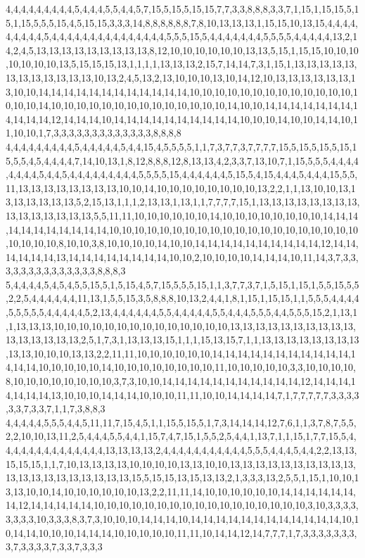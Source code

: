 4,4,4,4,4,4,4,4,4,5,4,4,4,5,5,4,4,5,7,15,5,15,5,15,15,7,7,3,3,8,8,8,3,3,7,1,15,1,15,15,5,15,1,15,5,5,5,15,4,5,15,15,3,3,3,14,8,8,8,8,8,8,7,8,10,13,13,13,1,15,15,10,13,15,4,4,4,4,4,4,4,4,4,5,4,4,4,4,4,4,4,4,4,4,4,4,4,4,4,5,5,5,15,5,4,4,4,4,4,4,4,5,5,5,5,4,4,4,4,4,13,2,14,2,4,5,13,13,13,13,13,13,13,13,13,8,12,10,10,10,10,10,10,13,13,5,15,1,15,15,10,10,10,10,10,10,10,13,5,15,15,15,13,1,1,1,1,13,13,13,2,15,7,14,14,7,3,1,15,1,13,13,13,13,13,13,13,13,13,13,13,13,10,13,2,4,5,13,2,13,10,10,10,13,10,14,12,10,13,13,13,13,13,13,13,10,10,14,14,14,14,14,14,14,14,14,14,14,14,10,10,10,10,10,10,10,10,10,10,10,10,10,10,10,10,14,10,10,10,10,10,10,10,10,10,10,10,10,10,10,14,10,10,14,14,14,14,14,14,14,14,14,14,14,12,14,14,14,10,14,14,14,14,14,14,14,14,14,14,10,10,10,14,10,10,14,14,10,11,10,10,1,7,3,3,3,3,3,3,3,3,3,3,3,3,3,8,8,8,8
4,4,4,4,4,4,4,4,4,5,4,4,4,4,4,5,4,4,15,4,5,5,5,5,1,1,7,3,7,7,3,7,7,7,7,15,5,15,5,15,5,15,15,5,5,4,5,4,4,4,4,7,14,10,13,1,8,12,8,8,8,12,8,13,13,4,2,3,3,7,13,10,7,1,15,5,5,5,4,4,4,4,4,4,4,4,5,4,4,5,4,4,4,4,4,4,4,4,4,5,5,5,5,15,4,4,4,4,4,4,5,15,5,4,15,4,4,4,5,4,4,4,15,5,5,11,13,13,13,13,13,13,13,13,10,10,14,10,10,10,10,10,10,10,10,13,2,2,1,1,13,10,10,13,13,13,13,13,13,13,5,2,15,13,1,1,1,2,13,13,1,13,1,1,7,7,7,7,15,1,13,13,13,13,13,13,13,13,13,13,13,13,13,13,13,5,5,11,11,10,10,10,10,10,10,14,10,10,10,10,10,10,10,10,14,14,14,14,14,14,14,14,14,14,14,10,10,10,10,10,10,10,10,10,10,10,10,10,10,10,10,10,10,10,10,10,10,10,10,8,10,10,3,8,10,10,10,10,14,10,10,14,14,14,14,14,14,14,14,14,14,12,14,14,14,14,14,14,13,14,14,14,14,14,14,14,14,10,10,2,10,10,10,10,14,14,14,10,11,14,3,7,3,3,3,3,3,3,3,3,3,3,3,3,3,3,8,8,8,3
5,4,4,4,4,5,4,5,4,5,5,15,5,1,5,15,4,5,7,15,5,5,5,15,1,1,3,7,7,3,7,1,5,15,1,15,1,5,5,15,5,5,2,2,5,4,4,4,4,4,4,11,13,1,5,5,15,3,5,8,8,8,10,13,2,4,4,1,8,1,15,1,15,15,1,1,5,5,5,4,4,4,4,5,5,5,5,5,4,4,4,4,4,5,2,13,4,4,4,4,4,4,5,5,4,4,4,4,4,5,5,4,4,4,5,5,5,4,4,5,5,5,15,2,1,13,1,1,13,13,13,10,10,10,10,10,10,10,10,10,10,10,10,10,10,13,13,13,13,13,13,13,13,13,13,13,13,13,13,13,13,2,5,1,7,3,1,13,13,13,15,1,1,1,15,13,15,7,1,1,13,13,13,13,13,13,13,13,13,13,10,10,10,13,13,2,2,11,11,10,10,10,10,10,10,14,14,14,14,14,14,14,14,14,14,14,14,14,14,10,10,10,10,10,14,10,10,10,10,10,10,10,10,11,10,10,10,10,10,3,3,10,10,10,10,8,10,10,10,10,10,10,10,10,3,7,3,10,10,14,14,14,14,14,14,14,14,14,14,14,12,14,14,14,14,14,14,14,13,10,10,10,14,14,14,10,10,10,11,11,10,10,14,14,14,14,7,1,7,7,7,7,7,3,3,3,3,3,3,7,3,3,7,1,1,7,3,8,8,3
4,4,4,4,4,5,5,5,4,4,5,11,11,7,15,4,5,1,1,15,5,15,5,1,7,3,14,14,14,12,7,6,1,1,3,7,8,7,5,5,2,2,10,10,13,11,2,5,4,4,4,5,5,4,4,1,15,7,4,7,15,1,5,5,2,5,4,4,1,13,7,1,1,15,1,7,7,15,5,4,4,4,4,4,4,4,4,4,4,4,4,4,4,13,13,13,13,2,4,4,4,4,4,4,4,4,4,4,4,5,5,5,4,4,4,5,4,4,2,2,13,13,15,15,15,1,1,7,10,13,13,13,13,10,10,10,10,13,13,10,10,13,13,13,13,13,13,13,13,13,13,13,13,13,13,13,13,13,13,13,13,15,5,15,15,13,15,13,13,2,1,3,3,3,13,2,5,5,1,15,1,10,10,13,13,10,10,14,10,10,10,10,10,10,13,2,2,11,11,14,10,10,10,10,10,10,14,14,14,14,14,14,14,12,14,14,14,14,14,10,10,10,10,10,10,10,10,10,10,10,10,10,10,10,10,10,3,10,3,3,3,3,3,3,3,3,10,3,3,3,8,3,7,3,10,10,10,14,14,14,10,14,14,14,14,14,14,14,14,14,14,14,14,10,10,14,14,10,10,10,14,14,14,10,10,10,10,10,11,11,10,14,14,12,14,7,7,7,1,7,3,3,3,3,3,3,3,3,7,3,3,3,3,7,3,3,7,3,3,3

